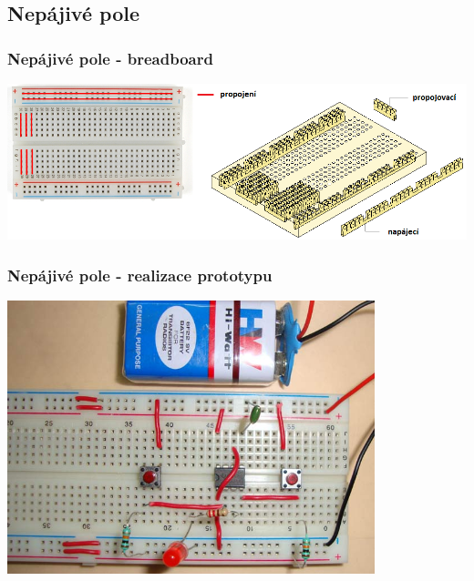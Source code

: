 \documentclass{beamer}
\begin{document}
\subsection{\texorpdfstring{Nepájivé pole}{Nepajive pole}}
  \begin{frame}
    \frametitle{Nepájivé pole - breadboard}
    \begin{center}
      \includegraphics[width=\textwidth]{obr/breadBoard_bot.png}
    \end{center}
  \end{frame}
  \begin{frame}
    \frametitle{Nepájivé pole - realizace prototypu}
    \begin{center}
      \includegraphics[width=0.8\textwidth]{obr/breadBoard_prot.png}
    \end{center}
  \end{frame}
\end{document}
